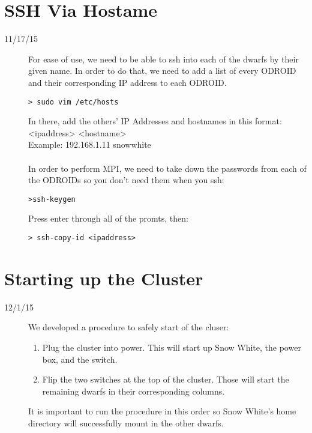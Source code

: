 \section{SSH Via Hostame}
\begin{description}
\item [11/17/15] For ease of use, we need to be able to ssh into each of the dwarfs by their given name. In order to do that, we need to add a list of every ODROID and their corresponding IP address to each ODROID.
\begin{lstlisting}
> sudo vim /etc/hosts
\end{lstlisting}
In there, add the others' IP Addresses and hostnames in this format: \\
<ipaddress> <hostname> \\
Example: 192.168.1.11 snow\textunderscore white \\ \\
In order to perform MPI, we need to take down the passwords from each of the ODROIDs so you don't need them when you ssh:
\begin{lstlisting}
>ssh-keygen
\end{lstlisting}
Press enter through all of the promts, then:
\begin{lstlisting}
> ssh-copy-id <ipaddress>
\end{lstlisting}
\end{description}

\section{Starting up the Cluster}
\begin{description}
\item [12/1/15] We developed a procedure to safely start of the cluser:
\begin{enumerate}
	\item Plug the cluster into power. This will start up Snow White, the power box, and the switch.
	\item Flip the two switches at the top of the cluster. Those will start the remaining dwarfs in their corresponding columns.
\end{enumerate}
It is important to run the procedure in this order so Snow White's home directory will successfully mount in the other dwarfs.
\end{description}

